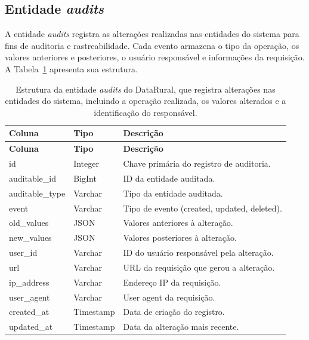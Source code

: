 \subsection{Entidade \textit{audits}}

A entidade \textit{audits} registra as alterações realizadas nas entidades do sistema para fins de auditoria e rastreabilidade. Cada evento armazena o tipo da operação, os valores anteriores e posteriores, o usuário responsável e informações da requisição. A Tabela~\ref{tab:entity_audits} apresenta sua estrutura.

\begin{longtable}{p{}p{}p{}}
\caption{Estrutura da entidade \textit{audits} do DataRural, que registra alterações nas entidades do sistema, incluindo a operação realizada, os valores alterados e a identificação do responsável.}\label{tab:entity_audits}\\
\toprule
\textbf{Coluna} & \textbf{Tipo} & \textbf{Descrição} \\
\midrule
\endfirsthead
\toprule
\textbf{Coluna} & \textbf{Tipo} & \textbf{Descrição} \\
\midrule
\endhead
id & Integer & Chave primária do registro de auditoria. \\
auditable\_id & BigInt & ID da entidade auditada. \\
auditable\_type & Varchar & Tipo da entidade auditada. \\
event & Varchar & Tipo de evento (created, updated, deleted). \\
old\_values & JSON & Valores anteriores à alteração. \\
new\_values & JSON & Valores posteriores à alteração. \\
user\_id & Varchar & ID do usuário responsável pela alteração. \\
url & Varchar & URL da requisição que gerou a alteração. \\
ip\_address & Varchar & Endereço IP da requisição. \\
user\_agent & Varchar & User agent da requisição. \\
created\_at & Timestamp & Data de criação do registro. \\
updated\_at & Timestamp & Data da alteração mais recente. \\
\bottomrule
\end{longtable}
